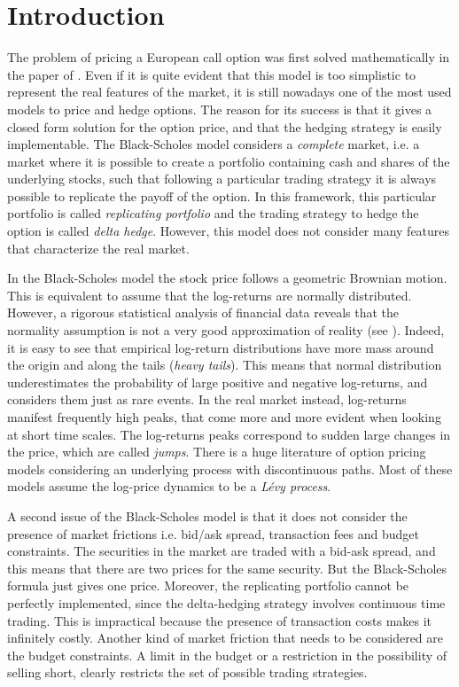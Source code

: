 

\chapter{Introduction}\label{Introd}
\minitoc%


\vspace{5em}

The problem of pricing a European call option was first solved mathematically in the paper of \cite{BS73}. 
Even if it is quite evident that this model is too simplistic to represent the real features of the market, it is 
still nowadays one of the most used models to price and hedge options.
The reason for its success is that it gives a closed form solution for the option price, and that the hedging strategy is easily 
implementable.
The Black-Scholes model considers a \emph{complete} market, i.e. a market where it is possible to create a portfolio containing cash 
and shares of the underlying stocks, such that following a particular trading strategy it is always possible to replicate
the payoff of the option. In this framework, this particular portfolio is called \emph{replicating portfolio} and
the trading strategy to hedge the option is called \emph{delta hedge}.
However, this model does not consider many features that characterize the real market. 

In the Black-Scholes model 
the stock price follows a geometric Brownian motion. This is equivalent to assume that the log-returns are 
normally distributed. 
However, a rigorous statistical analysis of financial data
reveals that the normality assumption is not a very good approximation of
reality (see \cite{Cont01}). Indeed, it is easy to see that empirical log-return distributions have
more mass around the origin and along the tails (\emph{heavy tails}).
This means that normal distribution underestimates the probability of large positive and negative
log-returns, and considers them just as rare events. In the real market instead,
log-returns manifest frequently high peaks, that come more and more evident
when looking at short time scales. The log-returns peaks correspond to sudden
large changes in the price, which are called \emph{jumps}. 
There is a huge literature of option pricing models considering an underlying process with discontinuous paths.
Most of these models assume the log-price dynamics to be a \emph{Lévy process}. 
 

A second issue of the Black-Scholes model is that it does not consider the presence of market frictions i.e.
bid/ask spread, transaction fees and budget constraints.
The securities in the market are traded with a bid-ask spread, and this means that there are two prices for the
same security. But the Black-Scholes formula just gives one price.
Moreover, the replicating portfolio cannot be perfectly implemented,
since the delta-hedging strategy involves continuous time trading. 
This is impractical because the presence of transaction costs makes it infinitely costly.
Another kind of market friction that needs to be considered are the budget constraints. 
A limit in the budget or a restriction in the possibility of 
selling short, clearly restricts the set of possible trading strategies.

